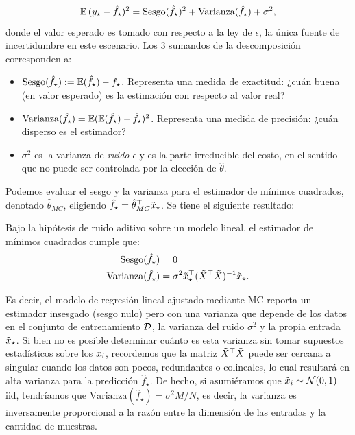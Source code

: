 \begin{equation}
 	\operatorname{\mathbb{E}}{(y_\star - \hat f_\star)^2} = \text{Sesgo}(\hat f_\star)^2 + \text{Varianza}(\hat f_\star) + \sigma^2,\label{eq:expected_sq_loss}
 \end{equation} 
donde el valor esperado es tomado con respecto a la ley de $\epsilon$, la única fuente de incertidumbre en este escenario. Los 3 sumandos de la descomposición corresponden a:
 \begin{itemize}
 	\item $\text{Sesgo}(\hat f_\star) := \operatorname{\mathbb{E}}(\hat f_\star) - f_\star$. Representa una medida de exactitud: ¿cuán buena (en valor esperado) es la estimación con respecto al valor real?
 	\item $\text{Varianza}(\hat f_\star) = \operatorname{\mathbb{E}}(\operatorname{\mathbb{E}}(\hat f_\star)- \hat f_\star)^2$. Representa una medida de precisión: ¿cuán disperso es el estimador?
 	\item $\sigma^2$ es la varianza de \emph{ruido} $\epsilon$ y es la parte irreducible del costo, en el sentido que no puede ser controlada por la elección de $\hat\theta$.
 \end{itemize}

Podemos evaluar el sesgo y la varianza para el estimador de mínimos cuadrados, denotado $\hat\theta_{MC}$, eligiendo $\hat f_\star = \hat\theta_{MC}^\top\tilde{x}_\star$. Se tiene el siguiente resultado:

\begin{theorem} Bajo la hipótesis de ruido aditivo sobre un modelo lineal, el estimador de mínimos cuadrados cumple que:
	\begin{align}
	\text{Sesgo}(\hat f_\star) &= 0\\
	\text{Varianza}(\hat f_\star) &= \sigma^2 \tilde{x}_\star^\top (\tilde{X}^\top\tilde{X})^{-1}	\tilde{x}_\star.
\end{align}
\end{theorem}

Es decir, el modelo de regresión lineal ajustado mediante MC reporta un estimador insesgado (sesgo nulo) pero con una varianza que depende de los datos en el conjunto de entrenamiento ${\mathcal D}$, la varianza del ruido $\sigma^2$ y la propia entrada $\tilde{x}_\star$. Si bien no es posible determinar cuánto es esta varianza sin tomar supuestos estadísticos sobre los $\tilde{x}_i$, recordemos que la matriz $\tilde{X}^\top\tilde{X}$ puede ser cercana a singular cuando los datos son pocos, redundantes o colineales, lo cual resultará en alta varianza para la predicción $\hat f_\star$. De hecho, si asumiéramos que $\tilde{x}_i\sim{\mathcal N}(0,1)$ iid, tendríamos que $\text{Varianza}(\hat f_\star) = \sigma^2 M/N$, es decir, la varianza es inversamente proporcional a la razón entre la dimensión de las entradas y la cantidad de muestras.\\

